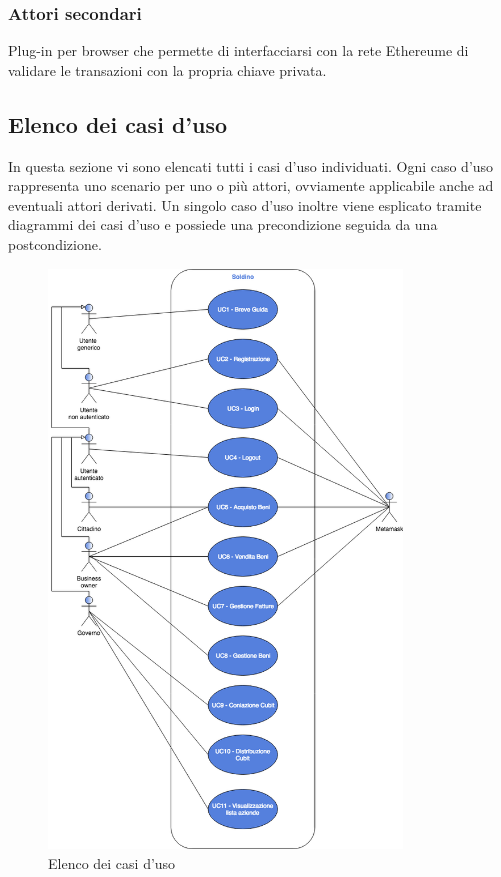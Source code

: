 \subsubsection{Attori secondari}\begin{description}[style=nextline]
	\item[MetaMask\glo]
	Plug-in per browser che permette di interfacciarsi con la rete Ethereum\glosp e di validare le transazioni con la propria chiave privata.

\end{description}

\subsection{Elenco dei casi d'uso}
In questa sezione vi sono elencati tutti i casi d'uso individuati. Ogni caso d'uso rappresenta uno scenario per uno o più attori, ovviamente applicabile anche ad eventuali attori derivati. Un singolo caso d'uso inoltre viene esplicato tramite diagrammi dei casi d'uso e possiede una precondizione seguida da una postcondizione.
\begin{figure}[h]
	\includegraphics[width=9.38cm]{res/images/Elenco_casi_d_uso.png}
	\centering
	\caption{Elenco dei casi d'uso}
\end{figure}
